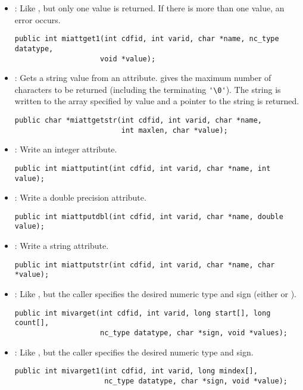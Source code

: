 \begin{itemize}
\item {} : Like , but only one value is
returned. If there is more than one value, an error occurs.
\begin{verbatim}
public int miattget1(int cdfid, int varid, char *name, nc_type datatype,
                    void *value);
\end{verbatim}

\item {} : Gets a string value from an attribute.
   gives the maximum number of characters to be returned
  (including the terminating \verb+'\0'+). The string is written to
  the array specified by value and a pointer to the string is
  returned.
\begin{verbatim}
public char *miattgetstr(int cdfid, int varid, char *name, 
                         int maxlen, char *value);
\end{verbatim}

\item {} : Write an integer attribute.
\begin{verbatim}
public int miattputint(int cdfid, int varid, char *name, int value);
\end{verbatim}

\item {} : Write a double precision attribute.
\begin{verbatim}
public int miattputdbl(int cdfid, int varid, char *name, double value);
\end{verbatim}

\item {} : Write a string attribute.
\begin{verbatim}
public int miattputstr(int cdfid, int varid, char *name, char *value);
\end{verbatim}

\item {} : Like , but the caller specifies
the desired numeric type and sign (either  or
).
\begin{verbatim}
public int mivarget(int cdfid, int varid, long start[], long count[],
                    nc_type datatype, char *sign, void *values);
\end{verbatim}

\item {} : Like , but the caller
specifies the desired numeric type and sign.
\begin{verbatim}
public int mivarget1(int cdfid, int varid, long mindex[],
                     nc_type datatype, char *sign, void *value);
\end{verbatim}


\end{itemize}
